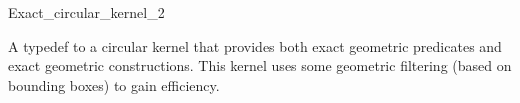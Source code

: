 \begin{ccRefClass}{Exact_circular_kernel_2}


\ccDefinition

A typedef to a circular kernel that provides both exact geometric
predicates and exact geometric constructions. This kernel uses some
geometric filtering (based on bounding boxes) to gain efficiency.

\ccIsModel


\ccSeeAlso


\end{ccRefClass}
